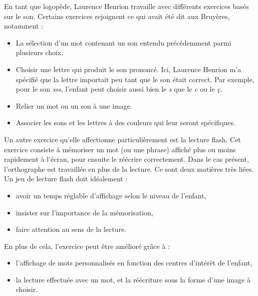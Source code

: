En tant que logopède, Laurence Henrion travaille avec différents exercices basés sur le son. Certains exercices rejoignent ce qui avait été dit aux Bruyères, notamment :
\begin{itemize}
\item La sélection d'un mot contenant un son entendu précédemment parmi plusieurs choix.
\item Choisir une lettre qui produit le son prononcé. Ici, Laurence Henrion m'a spécifié que la lettre importait peu tant que le son était correct. Par exemple, pour le son \textit{sss}, l'enfant peut choisir aussi bien le \textit{s} que le \textit{c} ou le \textit{ç.}
\item Relier un mot ou un son à une image.
\item Associer les sons et les lettres à des couleurs qui leur seront spécifiques.\\
\end{itemize}

Un autre exercice qu'elle affectionne particulièrement est la lecture flash.
Cet exercice consiste à mémoriser un mot (ou une phrase) affiché plus ou moins rapidement à l'écran, pour ensuite le réécrire correctement. Dans le cas présent, l'orthographe est travaillée en plus de la lecture. Ce sont deux matières très liées. Un jeu de lecture flash doit idéalement :
\begin{itemize}
\item avoir un temps réglable d'affichage selon le niveau de l'enfant,
\item insister sur l'importance de la mémorisation,
\item faire attention au sens de la lecture.
\end{itemize}
En plus de cela, l'exercice peut être amélioré grâce à :
\begin{itemize}
\item l'affichage de mots personnalisés en fonction des centres d'intérêt de l'enfant,
\item la lecture effectuée avec un mot, et la réécriture sous la forme d'une image à choisir.\\
\end{itemize}

